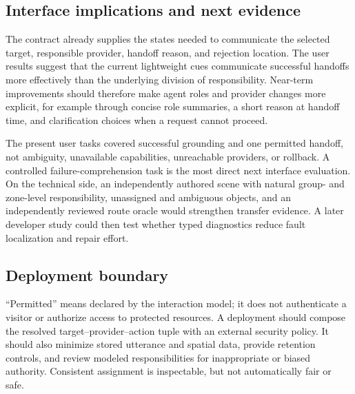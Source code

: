\subsection{Interface implications and next evidence}

The contract already supplies the states needed to communicate the selected
target, responsible provider, handoff reason, and rejection location.  The user
results suggest that the current lightweight cues communicate successful
handoffs more effectively than the underlying division of responsibility.
Near-term improvements should therefore make agent roles and provider changes
more explicit, for example through concise role summaries, a short reason at
handoff time, and clarification choices when a request cannot proceed.

The present user tasks covered successful grounding and one permitted handoff,
not ambiguity, unavailable capabilities, unreachable providers, or rollback.
A controlled failure-comprehension task is the most direct next interface
evaluation.  On the technical side, an independently authored scene with
natural group- and zone-level responsibility, unassigned and ambiguous objects,
and an independently reviewed route oracle would strengthen transfer evidence.
A later developer study could then test whether typed diagnostics reduce fault
localization and repair effort.

\subsection{Deployment boundary}

``Permitted'' means declared by the interaction model; it does not authenticate
a visitor or authorize access to protected resources.  A deployment should
compose the resolved target--provider--action tuple with an external security
policy.  It should also minimize stored utterance and spatial data, provide
retention controls, and review modeled responsibilities for inappropriate or
biased authority.  Consistent assignment is inspectable, but not automatically
fair or safe.
